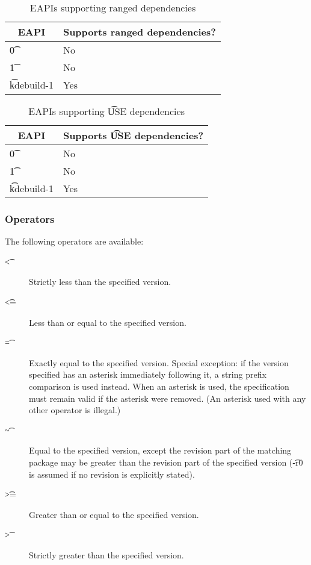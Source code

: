 \IFKDEBUILDELSE
{
    \begin{table}
    \centering
    \caption{EAPIs supporting ranged dependencies} \label{range-deps-table}
    \begin{tabular}{ l l }
        \toprule
        \multicolumn{1}{c}{\textbf{EAPI}} &
        \multicolumn{1}{c}{\textbf{Supports ranged dependencies?}} \\
        \midrule
    \t{0} & No \\
    \t{1} & No \\
    \t{kdebuild-1} & Yes \\
    \bottomrule
    \end{tabular}
    \end{table}

    \begin{table}
    \centering
    \caption{EAPIs supporting \t{USE} dependencies} \label{use-deps-table}
    \begin{tabular}{ l l }
        \toprule
        \multicolumn{1}{c}{\textbf{EAPI}} &
        \multicolumn{1}{c}{\textbf{Supports \t{USE} dependencies?}} \\
        \midrule
    \t{0} & No \\
    \t{1} & No \\
    \t{kdebuild-1} & Yes \\
    \bottomrule
    \end{tabular}
    \end{table}
}{
}

\subsubsection{Operators}
\label{dep-operator}

The following operators are available:

\begin{description}
\item[\t{<}] Strictly less than the specified version.
\item[\t{<=}] Less than or equal to the specified version.
\item[\t{=}] Exactly equal to the specified version. Special exception: if the version
    specified has an asterisk immediately following it, a string prefix comparison is
    used instead. When an asterisk is used, the specification must remain valid if the
    asterisk were removed. (An asterisk used with any other operator is illegal.)
\item[\t{\~}] Equal to the specified version, except the revision part of the matching
    package may be greater than the revision part of the specified version (\t{-r0} is
    assumed if no revision is explicitly stated).
\item[\t{>=}] Greater than or equal to the specified version.
\item[\t{>}] Strictly greater than the specified version.
\end{description}

